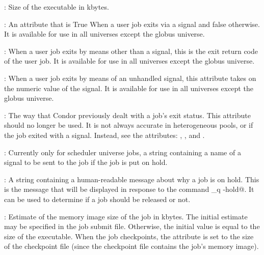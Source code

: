 \begin{description}
\item[\AdAttr{ExecutableSize}] : Size of the executable in kbytes.

\item[\AdAttr{ExitBySignal}] : An attribute that is True
When a user job exits via a signal and false otherwise.
It is available for use 
in all universes except the globus universe.

\item[\AdAttr{ExitCode}] : When a user job exits by means other than a signal,
this is the exit return code of the user job.
It is available for use 
in all universes except the globus universe.

\item[\AdAttr{ExitSignal}] : When a user job exits by means of an unhandled 
signal, this attribute takes on the numeric value of the signal.
It is available for use 
in all universes except the globus universe.

\item[\AdAttr{ExitStatus}] : The way that Condor previously dealt with
a job's exit status.
This attribute should no longer be used.
It is not always accurate in
heterogeneous pools, or if the job exited with a signal.
Instead, see the attributes: ,
, and
.

\item[\AdAttr{HoldKillSig}] :   Currently only for scheduler universe jobs,
a string containing a name of
a signal to be sent to the job if the job is put on hold.

\item[\AdAttr{HoldReason}] :   A string containing a human-readable
message about why a job is on hold.
This is the message that will be displayed in response to
the command \verb@condor\_q -hold@.
It can be used to determine if a job should be released or not.

\item[\AdAttr{ImageSize}] : Estimate of the memory image size of the
job in kbytes.  The initial estimate may be specified in the job
submit file.  Otherwise, the initial value is equal to the size of the
executable.  When the job checkpoints, the 
attribute is set to the size of the checkpoint file (since the
checkpoint file contains the job's memory image).


\end{description}
